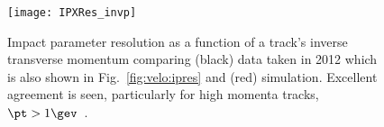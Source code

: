\begin{figure}
  \begin{center}
    \texttt{[image: IPXRes\_invp]}
    \caption[Impact parameter resolution as a function of inverse transverse momentum comparing
      data and
    simulation]{
      Impact parameter resolution as a function of a track's inverse transverse momentum comparing
      (black)
      data taken in 2012 which is also shown in Fig.~\protect\ref{fig:velo:ipres} and (red)
      simulation.  Excellent agreement is seen, particularly for high momenta tracks,
      $\pt>1\gev$~\protect\cite{LHCb-DP-2014-001}.
    }
    \label{fig:data:ipres}
  \end{center}
\end{figure}











